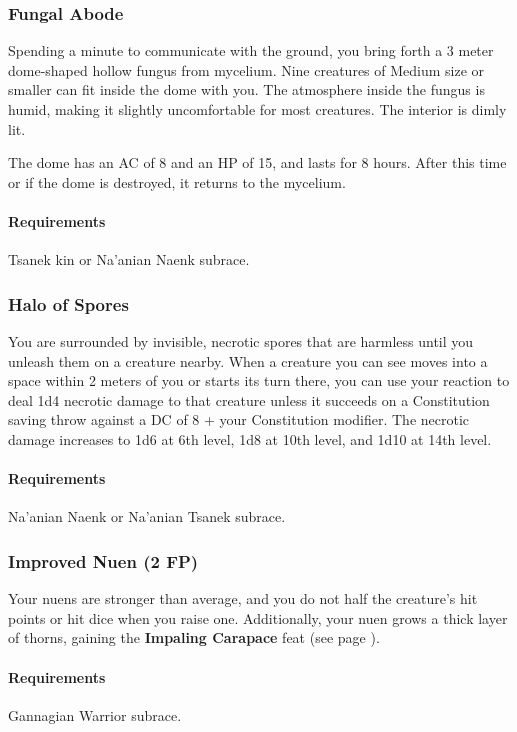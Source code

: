     \subsubsection{Fungal Abode} \label{feat::fungalabode}
        Spending a minute to communicate with the ground, you bring forth a 3 meter dome-shaped hollow fungus from mycelium.
        Nine creatures of Medium size or smaller can fit inside the dome with you.
        The atmosphere inside the fungus is humid, making it slightly uncomfortable for most creatures.
        The interior is dimly lit.

        The dome has an AC of 8 and an HP of 15, and lasts for 8 hours.
        After this time or if the dome is destroyed, it returns to the mycelium.
        \paragraph{Requirements} Tsanek kin or Na'anian Naenk subrace.
    \subsubsection{Halo of Spores} \label{feat::haloofspores}
        You are surrounded by invisible, necrotic spores that are harmless until you unleash them on a creature nearby.
        When a creature you can see moves into a space within 2 meters of you or starts its turn there, you can use your reaction to deal 1d4 necrotic damage to that creature unless it succeeds on a Constitution saving throw against a DC of 8 + your Constitution modifier.
        The necrotic damage increases to 1d6 at 6th level, 1d8 at 10th level, and 1d10 at 14th level.
        \paragraph{Requirements} Na'anian Naenk or Na'anian Tsanek subrace.
    \subsubsection{Improved Nuen (2 FP)} \label{feat::improvednuen}
        Your nuens are stronger than average, and you do not half the creature's hit points or hit dice when you raise one.
        Additionally, your nuen grows a thick layer of thorns, gaining the \textbf{Impaling Carapace} feat (see page \pageref{feat::impalingcarapace}).
        \paragraph{Requirements} Gannagian Warrior subrace.
